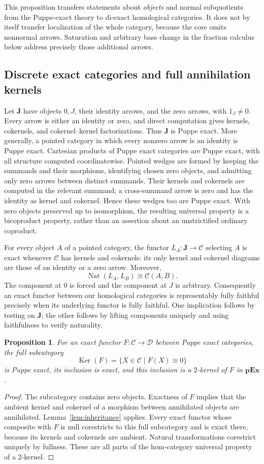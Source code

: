 \documentclass[11pt,reqno,a4paper]{amsart}
\newtheorem{proposition}[theorem]{Proposition}
\theoremstyle{definition}
\theoremstyle{remark}
\newcommand{\C}{\mathcal{C}}
\newcommand{\D}{\mathcal{D}}
\newcommand{\0}{\mathbf{0}}
\renewcommand{\1}{\mathbf{1}}
\newcommand{\pExact}{\mathbf{pEx}}
\DeclareMathOperator{\Ker}{Ker}
\DeclareMathOperator{\Nat}{Nat}
\begin{document}
This proposition transfers statements about \emph{objects} and normal
subquotients from the Puppe-exact theory to di-exact homological
categories. It does not by itself transfer localization of the whole
category, because the core omits nonnormal arrows. Saturation and
arbitrary base change in the fraction calculus below address precisely
those additional arrows.

\subsection{Discrete exact categories and full annihilation kernels}

Let $\mathbf J$ have objects $0,J$, their identity arrows, and the
zero arrows, with $1_J\ne0$. Every arrow is either an identity or
zero, and direct computation gives kernels, cokernels, and cokernel--kernel
factorizations. Thus $\mathbf J$ is Puppe exact. More generally,
a pointed category in which every nonzero arrow is an identity is
Puppe exact. Cartesian products of Puppe exact categories are Puppe
exact, with all structure computed coordinatewise. Pointed wedges
are formed by keeping the summands and their morphisms, identifying
chosen zero objects, and admitting only zero arrows between distinct
summands. Their kernels and cokernels are computed in the relevant
summand; a cross-summand arrow is zero and has the identity as kernel
and cokernel. Hence these wedges too are Puppe exact. With zero objects
preserved up to isomorphism, the resulting universal property is a
bicoproduct property, rather than an assertion about an unstrictified
ordinary coproduct.

For every object $A$ of a pointed category, the functor
$L_A:\mathbf J\to\C$ selecting $A$ is exact whenever $\C$ has kernels
and cokernels: its only kernel and cokernel diagrams are those of an
identity or a zero arrow. Moreover,
\[
 \Nat(L_A,L_B)\cong\C(A,B).
\]
The component at $0$ is forced and the component at $J$ is arbitrary.
Consequently an exact functor between our homological categories is
representably fully faithful precisely when its underlying functor is
fully faithful. One implication follows by testing on $\mathbf J$;
the other follows by lifting components uniquely and using faithfulness
to verify naturality.

\begin{proposition}\label{prop:puppe-kernels}
For an exact functor $F:\C\to\D$ between Puppe exact categories,
the full subcategory
\[
 \Ker(F)=\{X\in\C\mid F(X)\cong0\}
\]
is Puppe exact, its inclusion is exact, and this inclusion is a
$2$-kernel of $F$ in $\pExact$.
\end{proposition}
\begin{proof}
The subcategory contains zero objects. Exactness of $F$ implies that
the ambient kernel and cokernel of a morphism between annihilated
objects are annihilated. Lemma~\ref{lem:inheritance} applies.
Every exact functor whose composite with $F$ is null corestricts to
this full subcategory and is exact there, because its kernels and
cokernels are ambient. Natural transformations corestrict uniquely
by fullness. These are all parts of the hom-category universal
property of a $2$-kernel.
\end{proof}
\end{document}
